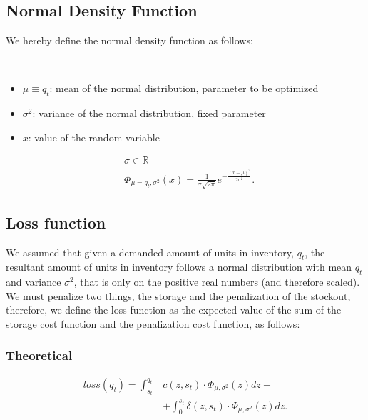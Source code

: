\documentclass{OptiFlow}
\begin{document}
\subsection{Normal Density Function}
We hereby define the normal density function as follows:

$\text{ }$

\hfill\begin{minipage}{\dimexpr0.5\textwidth-1cm}
\begin{itemize}
	\item $\mu \equiv q_t$: mean of the normal distribution, parameter to be optimized
	\item $\sigma^2$: variance of the normal distribution, fixed parameter
	\item $x$: value of the random variable
\end{itemize}
\end{minipage}

\begin{align*}
	&\sigma \in \mathbb{R}\\
	&\Phi_{\mu=q_t, \sigma^2}\left( x \right)   = \frac{1}{\sigma \sqrt{2\pi} }e^{- \frac{\left( x-\mu \right) ^2}{2 \sigma^2}}
.\end{align*}


\subsection{Loss function}
We assumed that given a demanded amount of units in inventory, $q_t$, the resultant amount of units in inventory
follows a normal distribution with mean $q_t$ and variance $\sigma^2$, that is only on the positive real numbers (and therefore scaled).
We must penalize two things, the storage and the penalization of the stockout, therefore, we define the loss function as 
the expected value of the sum of the storage cost function and the penalization cost function, as follows:

\subsubsection{Theoretical}
\begin{align*}
	loss\left( q_t \right)   = \int_{s_t}^{q_t} &c\left( z,s_t \right) \cdot \Phi_{\mu, \sigma^2}\left( z \right) dz+ \\
										&+ \int_{0}^{s_t} \delta\left( z,s_t \right)\cdot \Phi_{\mu, \sigma^2}\left( z \right) dz  
.\end{align*}
\end{document}

